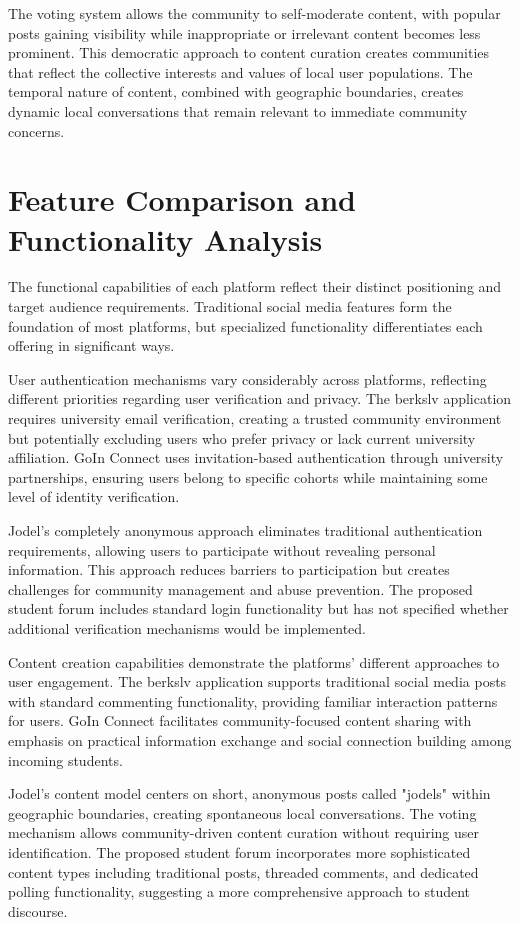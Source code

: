 The voting system allows the community to self-moderate content, with popular posts gaining visibility while inappropriate or irrelevant content becomes less prominent. This democratic approach to content curation creates communities that reflect the collective interests and values of local user populations. The temporal nature of content, combined with geographic boundaries, creates dynamic local conversations that remain relevant to immediate community concerns.

\section{Feature Comparison and Functionality Analysis}

The functional capabilities of each platform reflect their distinct positioning and target audience requirements. Traditional social media features form the foundation of most platforms, but specialized functionality differentiates each offering in significant ways.

User authentication mechanisms vary considerably across platforms, reflecting different priorities regarding user verification and privacy. The berkslv application requires university email verification, creating a trusted community environment but potentially excluding users who prefer privacy or lack current university affiliation. GoIn Connect uses invitation-based authentication through university partnerships, ensuring users belong to specific cohorts while maintaining some level of identity verification.

Jodel's completely anonymous approach eliminates traditional authentication requirements, allowing users to participate without revealing personal information. This approach reduces barriers to participation but creates challenges for community management and abuse prevention. The proposed student forum includes standard login functionality but has not specified whether additional verification mechanisms would be implemented.

Content creation capabilities demonstrate the platforms' different approaches to user engagement. The berkslv application supports traditional social media posts with standard commenting functionality, providing familiar interaction patterns for users. GoIn Connect facilitates community-focused content sharing with emphasis on practical information exchange and social connection building among incoming students.

Jodel's content model centers on short, anonymous posts called "jodels" within geographic boundaries, creating spontaneous local conversations. The voting mechanism allows community-driven content curation without requiring user identification. The proposed student forum incorporates more sophisticated content types including traditional posts, threaded comments, and dedicated polling functionality, suggesting a more comprehensive approach to student discourse.

